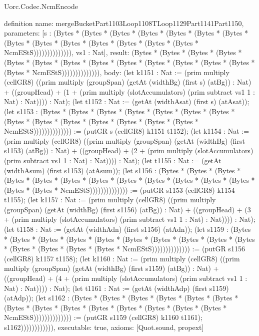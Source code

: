 \begin{lexlean}{Uorc.Codec.NcmEncode}
\begin{semanticmodule}
definition{
  name: mergeBucketPart1103Loop1108TLoop1129Part1141Part1150,
  parameters: [s : (Bytes * (Bytes * (Bytes * (Bytes * (Bytes * (Bytes * (Bytes * (Bytes * (Bytes * (Bytes * (Bytes * (Bytes * (Bytes * (Bytes * NcmEStS)))))))))))))), vs1 : Nat],
  result: (Bytes * (Bytes * (Bytes * (Bytes * (Bytes * (Bytes * (Bytes * (Bytes * (Bytes * (Bytes * (Bytes * (Bytes * (Bytes * (Bytes * NcmEStS)))))))))))))),
  body: (let k1151 : Nat := (prim multiply (cellGR8) ((prim multiply (groupSpan) (getAt (widthBg) (first s) (atBg)) : Nat) + ((groupHead) + (1 + (prim multiply (slotAccumulators) (prim subtract vs1 1 : Nat) : Nat)))) : Nat); (let t1152 : Nat := (getAt (widthAsat) (first s) (atAsat)); (let s1153 : (Bytes * (Bytes * (Bytes * (Bytes * (Bytes * (Bytes * (Bytes * (Bytes * (Bytes * (Bytes * (Bytes * (Bytes * (Bytes * (Bytes * NcmEStS)))))))))))))) := (putGR s (cellGR8) k1151 t1152); (let k1154 : Nat := (prim multiply (cellGR8) ((prim multiply (groupSpan) (getAt (widthBg) (first s1153) (atBg)) : Nat) + ((groupHead) + (2 + (prim multiply (slotAccumulators) (prim subtract vs1 1 : Nat) : Nat)))) : Nat); (let t1155 : Nat := (getAt (widthAsum) (first s1153) (atAsum)); (let s1156 : (Bytes * (Bytes * (Bytes * (Bytes * (Bytes * (Bytes * (Bytes * (Bytes * (Bytes * (Bytes * (Bytes * (Bytes * (Bytes * (Bytes * NcmEStS)))))))))))))) := (putGR s1153 (cellGR8) k1154 t1155); (let k1157 : Nat := (prim multiply (cellGR8) ((prim multiply (groupSpan) (getAt (widthBg) (first s1156) (atBg)) : Nat) + ((groupHead) + (3 + (prim multiply (slotAccumulators) (prim subtract vs1 1 : Nat) : Nat)))) : Nat); (let t1158 : Nat := (getAt (widthAdn) (first s1156) (atAdn)); (let s1159 : (Bytes * (Bytes * (Bytes * (Bytes * (Bytes * (Bytes * (Bytes * (Bytes * (Bytes * (Bytes * (Bytes * (Bytes * (Bytes * (Bytes * NcmEStS)))))))))))))) := (putGR s1156 (cellGR8) k1157 t1158); (let k1160 : Nat := (prim multiply (cellGR8) ((prim multiply (groupSpan) (getAt (widthBg) (first s1159) (atBg)) : Nat) + ((groupHead) + (4 + (prim multiply (slotAccumulators) (prim subtract vs1 1 : Nat) : Nat)))) : Nat); (let t1161 : Nat := (getAt (widthAdp) (first s1159) (atAdp)); (let s1162 : (Bytes * (Bytes * (Bytes * (Bytes * (Bytes * (Bytes * (Bytes * (Bytes * (Bytes * (Bytes * (Bytes * (Bytes * (Bytes * (Bytes * NcmEStS)))))))))))))) := (putGR s1159 (cellGR8) k1160 t1161); s1162)))))))))))),
  executable: true,
  axioms: [Quot.sound, propext]
}


\end{semanticmodule}
\end{lexlean}
